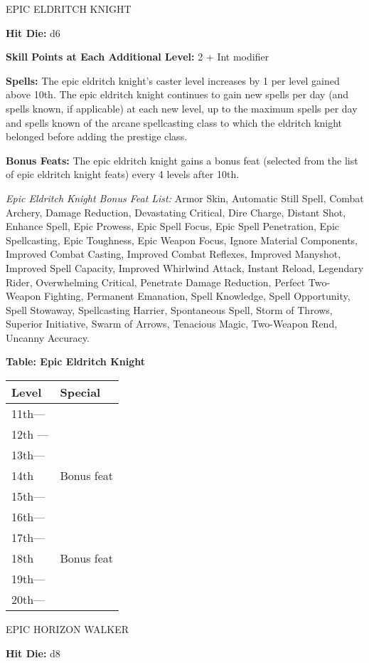 \documentclass{article}
\begin{document}
\vspace{12pt}
{\LARGE{}EPIC ELDRITCH KNIGHT}

\textbf{Hit Die: }d6

\textbf{Skill Points at Each Additional Level: }2 + Int modifier

\textbf{Spells: }The epic eldritch knight's caster level increases by 1 per level 
gained above 10th. The epic eldritch knight continues to gain new spells per day 
(and spells known, if applicable) at each new level, up to the maximum spells per 
day and spells known of the arcane spellcasting class to which the eldritch knight 
belonged before adding the prestige class.

\textbf{Bonus Feats: }The epic eldritch knight gains a bonus feat (selected from 
the list of epic eldritch knight feats) every 4 levels after 10th.

\textit{Epic Eldritch Knight Bonus Feat List: }Armor Skin, Automatic Still Spell, 
Combat Archery, Damage Reduction, Devastating Critical, Dire Charge, Distant Shot, 
Enhance Spell, Epic Prowess, Epic Spell Focus, Epic Spell Penetration, Epic Spellcasting, 
Epic Toughness, Epic Weapon Focus, Ignore Material Components, Improved Combat 
Casting, Improved Combat Reflexes, Improved Manyshot, Improved Spell Capacity, 
Improved Whirlwind Attack, Instant Reload, Legendary Rider, Overwhelming Critical, 
Penetrate Damage Reduction, Perfect Two-Weapon Fighting, Permanent Emanation, Spell 
Knowledge, Spell Opportunity, Spell Stowaway, Spellcasting Harrier, Spontaneous 
Spell, Storm of Throws, Superior Initiative, Swarm of Arrows, Tenacious Magic, 
Two-Weapon Rend, Uncanny Accuracy.

\textbf{Table: Epic Eldritch Knight}

\begin{tabular}{|>{\raggedright}p{29pt}|>{\raggedright}p{42pt}|}
\hline
L\textbf{evel } & S\textbf{pecial}\tabularnewline
\hline
11th--- & \tabularnewline
\hline
12th --- & \tabularnewline
\hline
13th--- & \tabularnewline
\hline
14th  & Bonus feat\tabularnewline
\hline
15th--- & \tabularnewline
\hline
16th--- & \tabularnewline
\hline
17th--- & \tabularnewline
\hline
18th  & Bonus feat\tabularnewline
\hline
19th--- & \tabularnewline
\hline
20th--- & \tabularnewline
\hline
\end{tabular}

\vspace{12pt}
{\LARGE{}EPIC HORIZON WALKER}

\textbf{Hit Die: }d8
\end{document}
